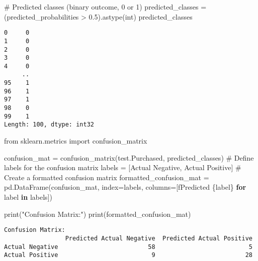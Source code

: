 \documentclass[
  letterpaper,
  DIV=11,
  numbers=noendperiod]{scrreprt}
\newenvironment{Shaded}{\begin{snugshade}}{\end{snugshade}}
\newcommand{\BuiltInTok}[1]{\textcolor[rgb]{0.00,0.23,0.31}{#1}}
\newcommand{\CommentTok}[1]{\textcolor[rgb]{0.37,0.37,0.37}{#1}}
\newcommand{\ControlFlowTok}[1]{\textcolor[rgb]{0.00,0.23,0.31}{\textbf{#1}}}
\newcommand{\FloatTok}[1]{\textcolor[rgb]{0.68,0.00,0.00}{#1}}
\newcommand{\ImportTok}[1]{\textcolor[rgb]{0.00,0.46,0.62}{#1}}
\newcommand{\KeywordTok}[1]{\textcolor[rgb]{0.00,0.23,0.31}{\textbf{#1}}}
\newcommand{\NormalTok}[1]{\textcolor[rgb]{0.00,0.23,0.31}{#1}}
\newcommand{\OperatorTok}[1]{\textcolor[rgb]{0.37,0.37,0.37}{#1}}
\newcommand{\SpecialCharTok}[1]{\textcolor[rgb]{0.37,0.37,0.37}{#1}}
\newcommand{\SpecialStringTok}[1]{\textcolor[rgb]{0.13,0.47,0.30}{#1}}
\newcommand{\StringTok}[1]{\textcolor[rgb]{0.13,0.47,0.30}{#1}}
\begin{document}
\begin{Shaded}
\begin{Highlighting}[]
\CommentTok{\# Predicted classes (binary outcome, 0 or 1)}
\NormalTok{predicted\_classes }\OperatorTok{=}\NormalTok{ (predicted\_probabilities }\OperatorTok{\textgreater{}} \FloatTok{0.5}\NormalTok{).astype(}\BuiltInTok{int}\NormalTok{)}
\NormalTok{predicted\_classes}
\end{Highlighting}
\end{Shaded}

\begin{verbatim}
0     0
1     0
2     0
3     0
4     0
     ..
95    1
96    1
97    1
98    0
99    1
Length: 100, dtype: int32
\end{verbatim}

\begin{Shaded}
\begin{Highlighting}[]
\ImportTok{from}\NormalTok{ sklearn.metrics }\ImportTok{import}\NormalTok{ confusion\_matrix}
\end{Highlighting}
\end{Shaded}

\begin{Shaded}
\begin{Highlighting}[]
\NormalTok{confusion\_mat }\OperatorTok{=}\NormalTok{ confusion\_matrix(test.Purchased, predicted\_classes)}
\CommentTok{\# Define labels for the confusion matrix}
\NormalTok{labels }\OperatorTok{=}\NormalTok{ [}\StringTok{\textquotesingle{}Actual Negative\textquotesingle{}}\NormalTok{, }\StringTok{\textquotesingle{}Actual Positive\textquotesingle{}}\NormalTok{]}
\CommentTok{\# Create a formatted confusion matrix}
\NormalTok{formatted\_confusion\_mat }\OperatorTok{=}\NormalTok{ pd.DataFrame(confusion\_mat, index}\OperatorTok{=}\NormalTok{labels, columns}\OperatorTok{=}\NormalTok{[}\SpecialStringTok{f\textquotesingle{}Predicted }\SpecialCharTok{\{}\NormalTok{label}\SpecialCharTok{\}}\SpecialStringTok{\textquotesingle{}} \ControlFlowTok{for}\NormalTok{ label }\KeywordTok{in}\NormalTok{ labels])}

\BuiltInTok{print}\NormalTok{(}\StringTok{"Confusion Matrix:"}\NormalTok{)}
\BuiltInTok{print}\NormalTok{(formatted\_confusion\_mat)}
\end{Highlighting}
\end{Shaded}

\begin{verbatim}
Confusion Matrix:
                 Predicted Actual Negative  Predicted Actual Positive
Actual Negative                         58                          5
Actual Positive                          9                         28
\end{verbatim}
\end{document}
